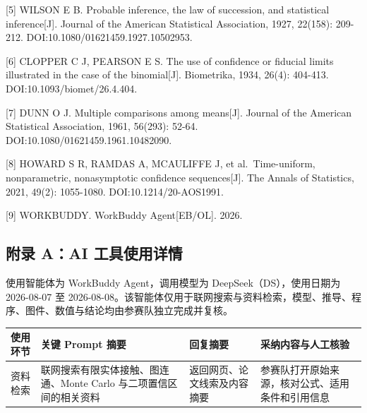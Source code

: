 {[}5{]} WILSON E B. Probable inference, the law of succession, and statistical inference{[}J{]}. Journal of the American Statistical Association, 1927, 22(158): 209-212. DOI:10.1080/01621459.1927.10502953.

{[}6{]} CLOPPER C J, PEARSON E S. The use of confidence or fiducial limits illustrated in the case of the binomial{[}J{]}. Biometrika, 1934, 26(4): 404-413. DOI:10.1093/biomet/26.4.404.

{[}7{]} DUNN O J. Multiple comparisons among means{[}J{]}. Journal of the American Statistical Association, 1961, 56(293): 52-64. DOI:10.1080/01621459.1961.10482090.

{[}8{]} HOWARD S R, RAMDAS A, MCAULIFFE J, et al.~Time-uniform, nonparametric, nonasymptotic confidence sequences{[}J{]}. The Annals of Statistics, 2021, 49(2): 1055-1080. DOI:10.1214/20-AOS1991.

{[}9{]} WORKBUDDY. WorkBuddy Agent{[}EB/OL{]}. 2026.

\endgroup
\clearpage
{}

\subsection{附录 A：AI 工具使用详情}\label{ux9644ux5f55-aai-ux5de5ux5177ux4f7fux7528ux8be6ux60c5}

使用智能体为 WorkBuddy Agent，调用模型为 DeepSeek（DS），使用日期为 2026-08-07 至 2026-08-08。该智能体仅用于联网搜索与资料检索，模型、推导、程序、图件、数值与结论均由参赛队独立完成并复核。

{\def\LTcaptype{none} %
\small
\setlength{\tabcolsep}{4pt}
\begin{longtable}[]{@{}
  >{\raggedright\arraybackslash}p{}
  >{\raggedright\arraybackslash}p{}
  >{\raggedright\arraybackslash}p{}
  >{\raggedright\arraybackslash}p{}@{}}
\toprule\noalign{}
\begin{minipage}[b]{\linewidth}\raggedright
使用环节
\end{minipage} & \begin{minipage}[b]{\linewidth}\raggedright
关键 Prompt 摘要
\end{minipage} & \begin{minipage}[b]{\linewidth}\raggedright
回复摘要
\end{minipage} & \begin{minipage}[b]{\linewidth}\raggedright
采纳内容与人工核验
\end{minipage} \\
\midrule\noalign{}
\endhead
\bottomrule\noalign{}
\endlastfoot
资料检索 & 联网搜索有限实体接触、图连通、Monte Carlo 与二项置信区间的相关资料 & 返回网页、论文线索及内容摘要 & 参赛队打开原始来源，核对公式、适用条件和引用信息 \\
\end{longtable}
}

